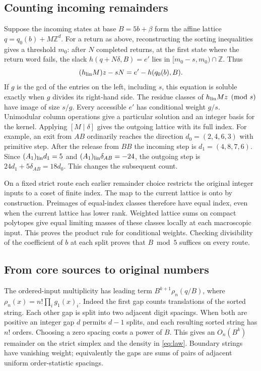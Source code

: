 \documentclass[11pt,reqno]{amsart}
\newcommand{\ZZ}{\mathbb Z}
\begin{document}
\subsection{Counting incoming remainders}
Suppose the incoming states at base $B=5b+\beta$ form the affine lattice
$q=q_0(b)+M\ZZ^d$. For a return as above, reconstructing the sorting
inequalities gives a threshold $m_0$: after $N$ completed returns, at the first state where the return word fails, the slack
$h(q+N\delta,B)=e'$ lies in $[m_0-s,m_0)\cap\ZZ$. Thus
\[
 (h_{\rm lin}M)z-sN=e'-h(q_0(b),B).
\]
If $g$ is the gcd of the entries on the left, including $s$, this equation
is soluble exactly when $g$ divides its right-hand side. The residue classes
of $h_{\rm lin}Mz\pmod s$ have image of size $s/g$. Every accessible
$e'$ has conditional weight $g/s$. Unimodular column operations give a
particular solution and an integer basis for the kernel. Applying
$[M\mid\delta]$ gives the outgoing lattice with its full index.
For example, an exit from $AB$ ordinarily reaches the direction
$d_0=(2,4,6,3)$ with primitive step. After the release from $BB$ the
incoming step is $d_1=(4,8,7,6)$. Since $(A_1)_{\rm lin}d_1=5$
and $(A_1)_{\rm lin}\delta_{AB}=-24$, the outgoing step is
$24d_1+5\delta_{AB}=18d_0$. This changes the subsequent count.

On a fixed strict route each earlier remainder choice restricts the original
integer inputs to a coset of finite index. The map to the current lattice
is onto by construction. Preimages of equal-index classes therefore have
equal index, even when the current lattice has lower rank. Weighted lattice
sums on compact polytopes give equal limiting masses of these classes
locally at each macroscopic input. This proves the product rule for
conditional weights. Checking divisibility of the coefficient of $b$ at
each split proves that $B\bmod5$ suffices on every route.

\subsection{From core sources to original numbers}
The ordered-input multiplicity has leading term
$B^{k+1}\rho_n(q/B)$, where $\rho_n(x)=n!\prod_i g_1(x)_i$.
Indeed the first gap counts translations of the sorted string. Each
other gap is split into two adjacent digit spacings. When both are positive
an integer gap $d$ permits $d-1$ splits, and each resulting sorted string
has $n!$ orders. Choosing a zero spacing costs a power of $B$.
This gives an $O_n(B^k)$ remainder on the strict simplex and the density
in \eqref{eq:law}. Boundary strings have vanishing weight; equivalently
the gaps are sums of pairs of adjacent uniform order-statistic spacings.
\end{document}
